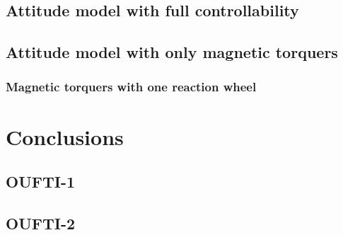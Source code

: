 \documentclass[10pt]{article}
\begin{document}
\subsection{Attitude model with full controllability}
\subsection{Attitude model with only magnetic torquers}
\subsubsection{Magnetic torquers with one reaction wheel}
\section{Conclusions}
\subsection{OUFTI-1}
\subsection{OUFTI-2}
\end{document}
